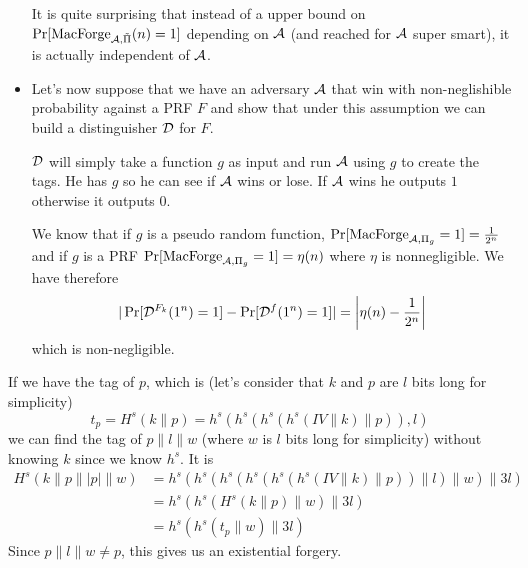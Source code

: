 \begin{solution}
\begin{itemize}
      It is quite surprising that instead of a upper bound
      on $\Pr[\operatorname{MacForge}_{\mathcal{A}, \tilde{\Pi}}(n) = 1]$
      depending on $\mathcal{A}$ (and reached for $\mathcal{A}$ super smart),
      it is actually independent of $\mathcal{A}$.
    \item
      Let's now suppose that we have an adversary $\mathcal{A}$
      that win with non-neglishible probability against a PRF $F$
      and show that under this assumption we can build
      a distinguisher $\mathcal{D}$ for $F$.

      $\mathcal{D}$ will simply take a function $g$ as input
      and run $\mathcal{A}$ using $g$ to create the tags.
      He has $g$ so he can see if $\mathcal{A}$ wins or lose.
      If $\mathcal{A}$ wins he outputs $1$ otherwise it outputs $0$.

      We know that if $g$ is a pseudo random function,
      $\Pr[\operatorname{MacForge}_{\mathcal{A}, \Pi_g} = 1] = \frac{1}{2^n}$
      and if $g$ is a PRF
      $\Pr[\operatorname{MacForge}_{\mathcal{A}, \Pi_g} = 1] = \eta(n)$
      where $\eta$ is nonnegligible.
      We have therefore
      \[
        |\Pr[\mathcal{D}^{F_k}(1^n) = 1] - \Pr[\mathcal{D}^{f}(1^n) = 1]|
        = \left|\eta(n) - \frac{1}{2^n}\right|
      \]
      which is non-negligible.

  \end{itemize}

\end{solution}

\begin{solution}
  If we have the tag of $p$, which is (let's consider that $k$ and $p$ are $l$ bits long for simplicity)
  \[ t_p = H^s(k\|p) = h^s(h^s(h^s(h^s(IV \| k) \| p)), l) \]
  we can find the tag of $p\|l\|w$ (where $w$ is $l$ bits long for simplicity)
  without knowing $k$ since we know $h^s$.
  It is
  \begin{align*}
    H^s(k\|p\||p|\|w)
    & = h^s(h^s(h^s(h^s(h^s(h^s(IV \| k) \| p)) \| l) \| w) \| 3l)\\
    & = h^s(h^s(H^s(k \| p) \| w) \| 3l)\\
    & = h^s(h^s(t_p \| w) \| 3l)
  \end{align*}
  Since $p\|l\|w \neq p$, this gives us an existential forgery.
\end{solution}

